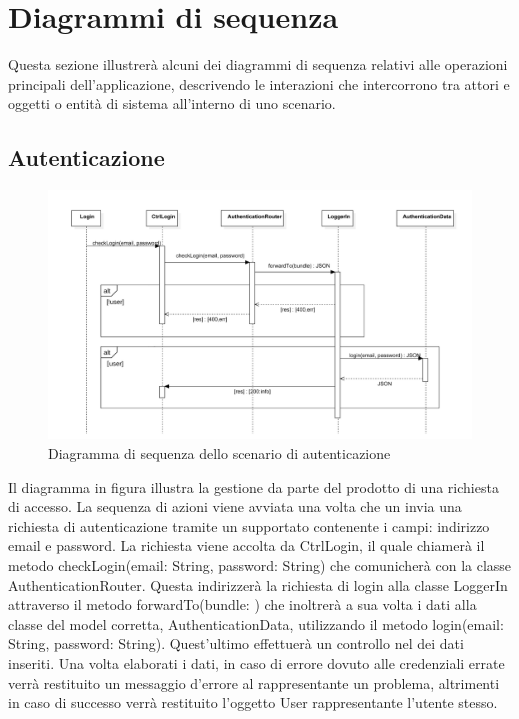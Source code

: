 \documentclass[a4paper, titlepage]{article}
\begin{document}
\newpage
\section{Diagrammi di sequenza}
Questa sezione illustrerà alcuni dei diagrammi di sequenza relativi alle operazioni principali
dell'applicazione, descrivendo le interazioni che intercorrono tra attori e oggetti o entità di
sistema all'interno di uno scenario.

\subsection{Autenticazione}
\begin{figure}[!h]
	\centering
	\includegraphics[scale=0.5]{Img/seq-login.pdf}
	\caption{Diagramma di sequenza dello scenario di autenticazione}
\end{figure}
Il diagramma in figura illustra la gestione da parte del prodotto di una richiesta di accesso. La sequenza di azioni viene avviata una volta che un  invia una richiesta di autenticazione tramite un   supportato contenente i campi: indirizzo email e password.
La richiesta viene accolta da CtrlLogin, il quale chiamerà il metodo checkLogin(email: String, password: String) che comunicherà con la classe AuthenticationRouter. Questa indirizzerà la richiesta di login alla classe LoggerIn attraverso il metodo forwardTo(bundle: ) che inoltrerà a sua volta i dati alla classe del model corretta, AuthenticationData, utilizzando il metodo login(email: String, password: String). Quest'ultimo effettuerà un controllo nel  dei dati inseriti. Una volta elaborati i dati, in caso di errore dovuto alle credenziali errate verrà restituito un messaggio d'errore al  rappresentante un problema, altrimenti in caso di successo verrà restituito l'oggetto User rappresentante l'utente stesso.
\end{document}
